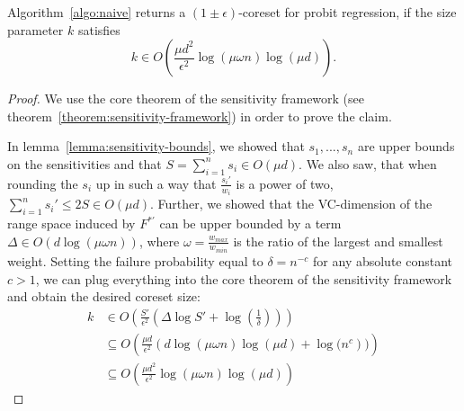 \begin{theorem}
    Algorithm~\ref{algo:naive} returns a $(1 \pm \epsilon)$-coreset
    for probit regression, if the size parameter $k$ satisfies
    \begin{equation*}
        k \in O\left(\frac{\mu d^2}{\epsilon^2} \log(\mu \omega n) \log(\mu d)\right).
    \end{equation*}
\end{theorem}
\begin{proof}
    We use the core theorem of the sensitivity framework
    (see theorem~\ref{theorem:sensitivity-framework}) in order
    to prove the claim.

    In lemma~\ref{lemma:sensitivity-bounds},
    we showed that $s_1, ..., s_n$
    are upper bounds on the sensitivities and that
    $S = \sum_{i=1}^n s_i \in O(\mu d)$.
    We also saw, that when rounding the $s_i$ up in such a way that
    $\frac{s_i'}{w_i}$ is a power of two,
    $\sum_{i=1}^n s_i' \leq 2S \in O(\mu d)$.
    Further, we showed that the VC-dimension of the range space
    induced by $F^{\ast '}$ can be upper bounded by
    a term $\Delta \in O(d\log(\mu \omega n))$, where
    $\omega = \frac{w_{max}}{w_{min}}$ is the ratio of the
    largest and smallest weight.
    Setting the failure probability equal to $\delta = n^{-c}$
    for any absolute constant $c > 1$, we can plug everything
    into the core theorem of the sensitivity framework and
    obtain the desired coreset size:
    \begin{align*}
        k & \in O\left( \frac{S'}{\epsilon^2} \left(\Delta \log S' + \log\left(\frac{1}{\delta}\right)\right)\right)  \\
          & \subseteq O\left(\frac{\mu d}{\epsilon^2}\left(d \log(\mu \omega n) \log(\mu d) + \log(n^c\right))\right) \\
          & \subseteq O\left(\frac{\mu d^2}{\epsilon^2}\log(\mu \omega n) \log(\mu d)\right)
    \end{align*}
\end{proof}
